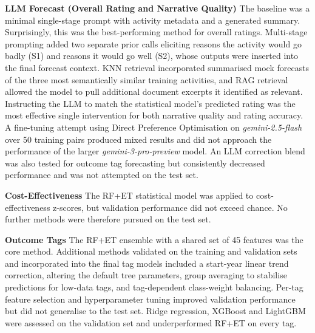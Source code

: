 \documentclass[12pt,a4paper]{article}
\begin{document}
\textbf{LLM Forecast (Overall Rating and Narrative Quality)}
The baseline was a minimal single-stage prompt with activity metadata and a generated summary. Surprisingly, this was the best-performing method for overall ratings.
Multi-stage prompting added two separate prior calls eliciting reasons the activity would go badly (S1) and reasons it would go well (S2), whose outputs were inserted into the final forecast context.
KNN retrieval incorporated summarised mock forecasts of the three most semantically similar training activities, and RAG retrieval allowed the model to pull additional document excerpts it identified as relevant.
Instructing the LLM to match the statistical model's predicted rating was the most effective single intervention for both narrative quality and rating accuracy.
A fine-tuning attempt using Direct Preference Optimisation on \emph{gemini-2.5-flash} over 50 training pairs produced mixed results and did not approach the performance of the larger \emph{gemini-3-pro-preview} model. An LLM correction blend was also tested for outcome tag forecasting but consistently decreased performance and was not attempted on the test set.

\textbf{Cost-Effectiveness}
The RF+ET statistical model was applied to cost-effectiveness z-scores, but validation performance did not exceed chance. No further methods were therefore pursued on the test set.

\textbf{Outcome Tags}
The RF+ET ensemble with a shared set of 45 features was the core method. Additional methods validated on the training and validation sets and incorporated into the final tag models included a start-year linear trend correction, altering the default tree parameters, group averaging to stabilise predictions for low-data tags, and tag-dependent class-weight balancing.
Per-tag feature selection and hyperparameter tuning improved validation performance but did not generalise to the test set.
Ridge regression, XGBoost and LightGBM were assessed on the validation set and underperformed RF+ET on every tag.
\end{document}
